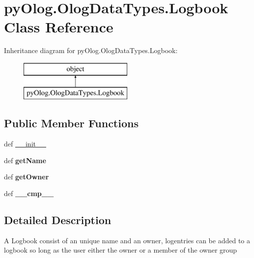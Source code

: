 \hypertarget{classpyOlog_1_1OlogDataTypes_1_1Logbook}{\section{py\-Olog.\-Olog\-Data\-Types.\-Logbook Class Reference}
\label{classpyOlog_1_1OlogDataTypes_1_1Logbook}
}
Inheritance diagram for py\-Olog.\-Olog\-Data\-Types.\-Logbook\-:\begin{figure}[H]
\begin{center}
\leavevmode
\includegraphics[height=2.000000cm]{classpyOlog_1_1OlogDataTypes_1_1Logbook}
\end{center}
\end{figure}
\subsection*{Public Member Functions}
\begin{DoxyCompactItemize}
\item 
def \hyperlink{classpyOlog_1_1OlogDataTypes_1_1Logbook_a98e02bb45dcbfeecc9e943e80e5ba0f8}{\-\_\-\-\_\-init\-\_\-\-\_\-}
\item 
\hypertarget{classpyOlog_1_1OlogDataTypes_1_1Logbook_ae39aeb8825d2138c1ff43d7c50366795}{def {\bfseries get\-Name}}\label{classpyOlog_1_1OlogDataTypes_1_1Logbook_ae39aeb8825d2138c1ff43d7c50366795}

\item 
\hypertarget{classpyOlog_1_1OlogDataTypes_1_1Logbook_a98510d4f009cf86a29003df5905c8727}{def {\bfseries get\-Owner}}\label{classpyOlog_1_1OlogDataTypes_1_1Logbook_a98510d4f009cf86a29003df5905c8727}

\item 
\hypertarget{classpyOlog_1_1OlogDataTypes_1_1Logbook_a7fcc126baf6e6921b512228e0217e438}{def {\bfseries \-\_\-\-\_\-cmp\-\_\-\-\_\-}}\label{classpyOlog_1_1OlogDataTypes_1_1Logbook_a7fcc126baf6e6921b512228e0217e438}

\end{DoxyCompactItemize}


\subsection{Detailed Description}
\begin{DoxyVerb}A Logbook consist of an unique name and an owner, 
logentries can be added to a logbook so long as the user either the owner
or a member of the owner group
\end{DoxyVerb}
 

